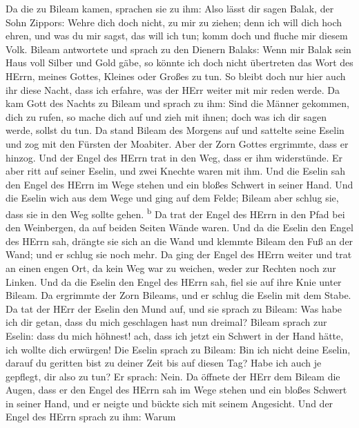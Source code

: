 Da die zu Bileam kamen, sprachen sie zu ihm: Also lässt dir sagen Balak,
der Sohn Zippors: Wehre dich doch nicht, zu mir zu ziehen;
 denn ich will dich hoch ehren, und was du mir sagst, das
will ich tun; komm doch und fluche mir diesem Volk. 
Bileam antwortete und sprach zu den Dienern Balaks: Wenn mir Balak sein
Haus voll Silber und Gold gäbe, so könnte ich doch nicht übertreten das
Wort des HErrn, meines Gottes, Kleines oder Großes zu tun.
 So bleibt doch nur hier auch ihr diese Nacht, dass ich
erfahre, was der HErr weiter mit mir reden werde.  Da kam
Gott des Nachts zu Bileam und sprach zu ihm: Sind die Männer gekommen,
dich zu rufen, so mache dich auf und zieh mit ihnen; doch was ich dir
sagen werde, sollst du tun.  Da stand Bileam des Morgens
auf und sattelte seine Eselin und zog mit den Fürsten der Moabiter.
 Aber der Zorn Gottes ergrimmte, dass er hinzog. Und der
Engel des HErrn trat in den Weg, dass er ihm widerstünde. Er aber ritt
auf seiner Eselin, und zwei Knechte waren mit ihm.  Und
die Eselin sah den Engel des HErrn im Wege stehen und ein bloßes Schwert
in seiner Hand. Und die Eselin wich aus dem Wege und ging auf dem Felde;
Bileam aber schlug sie, dass sie in den Weg sollte gehen.
\textsuperscript{b}  Da trat der Engel des HErrn in den
Pfad bei den Weinbergen, da auf beiden Seiten Wände waren.
 Und da die Eselin den Engel des HErrn sah, drängte sie
sich an die Wand und klemmte Bileam den Fuß an der Wand; und er schlug
sie noch mehr.  Da ging der Engel des HErrn weiter und
trat an einen engen Ort, da kein Weg war zu weichen, weder zur Rechten
noch zur Linken.  Und da die Eselin den Engel des HErrn
sah, fiel sie auf ihre Knie unter Bileam. Da ergrimmte der Zorn Bileams,
und er schlug die Eselin mit dem Stabe.  Da tat der HErr
der Eselin den Mund auf, und sie sprach zu Bileam: Was habe ich dir
getan, dass du mich geschlagen hast nun dreimal?  Bileam
sprach zur Eselin: dass du mich höhnest! ach, dass ich jetzt ein Schwert
in der Hand hätte, ich wollte dich erwürgen!  Die Eselin
sprach zu Bileam: Bin ich nicht deine Eselin, darauf du geritten bist zu
deiner Zeit bis auf diesen Tag? Habe ich auch je gepflegt, dir also zu
tun? Er sprach: Nein.  Da öffnete der HErr dem Bileam die
Augen, dass er den Engel des HErrn sah im Wege stehen und ein bloßes
Schwert in seiner Hand, und er neigte und bückte sich mit seinem
Angesicht.  Und der Engel des HErrn sprach zu ihm: Warum
